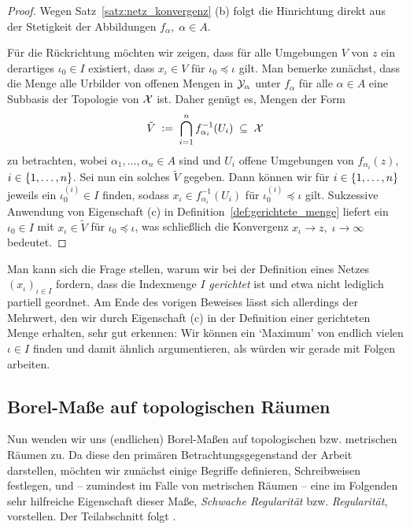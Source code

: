 \documentclass[../main/main.tex]{subfiles}
\begin{document}
	\begin{proof}
		Wegen Satz~\ref{satz:netz_konvergenz} (b) folgt die Hinrichtung direkt aus der Stetigkeit der Abbildungen $f_\alpha, \; \alpha \in A$.
		
		Für die Rückrichtung möchten wir zeigen, dass für alle Umgebungen $V$ von $z$ ein derartiges $\iota_0 \in I$ existiert, dass $x_\iota \in V$ für $\iota_0 \preceq \iota$ gilt.
		Man bemerke zunächst, dass die Menge alle Urbilder von offenen Mengen in $\mathcal{Y}_\alpha$ unter $f_\alpha$ für alle $\alpha \in A$ eine Subbasis der Topologie von $\mathcal{X}$ ist.
		Daher genügt es, Mengen der Form
		\[ \tilde{V} \; \vcentcolon = \; \bigcap_{i=1}^{n} f_{\alpha_i}^{-1}(U_i) \; \subseteq \; \mathcal{X} \]
		zu betrachten, wobei $\alpha_1, \dots, \alpha_n \in A$ sind und $U_i$ offene Umgebungen von $f_{\alpha_i}(z)$, $i \in \left\{1, \dots, n\right\}$.
		Sei nun ein solches $\tilde{V}$ gegeben. Dann können wir für $i \in \left\{1, \dots, n\right\}$ jeweils ein $\iota_0^{(i)} \in I$ finden, sodass $x_\iota \in f_{\alpha_i}^{-1}(U_i)$ für 
		$\iota_0^{(i)} \preceq \iota$ gilt. Sukzessive Anwendung von Eigenschaft (c) in Definition~\ref{def:gerichtete_menge} liefert ein $\iota_0 \in I$ mit 
		$x_\iota \in \tilde{V}$ für $\iota_0 \preceq \iota$, was schließlich die Konvergenz $x_\iota \to z, \; \iota \to \infty$ bedeutet.
	\end{proof}

	\begin{Bemerkung}
		Man kann sich die Frage stellen, warum wir bei der Definition eines Netzes $(x_\iota)_{\iota \in I}$ fordern, dass die Indexmenge $I$ \emph{gerichtet} ist und etwa nicht lediglich
		partiell geordnet. Am Ende des vorigen Beweises lässt sich allerdings der Mehrwert, den wir durch Eigenschaft (c) in der Definition einer gerichteten Menge erhalten, sehr gut erkennen: 
		Wir können ein \enquote*{Maximum} 
		von endlich vielen $\iota \in I$ finden und damit ähnlich argumentieren, als würden wir gerade mit Folgen arbeiten.
	\end{Bemerkung}
	
	\subsection{Borel-Maße auf topologischen Räumen}
	\label{subsec:borel-maße_auf_topologischen_räumen}
	
	Nun wenden wir uns (endlichen) Borel-Maßen auf topologischen bzw. metrischen Räumen zu. Da diese den primären Betrachtungsgegenstand der
	Arbeit darstellen, möchten wir zunächst einige Begriffe definieren, Schreibweisen festlegen, und -- zumindest im Falle von metrischen Räumen -- eine im Folgenden sehr 
	hilfreiche Eigenschaft dieser Maße, \emph{Schwache Regularität} bzw. \emph{Regularität}, vorstellen.
	Der Teilabschnitt folgt \cite[Kapitel 4.14]{Simon.2015}.
	
\end{document}
